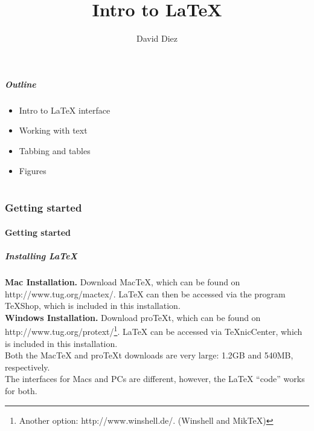 \documentclass[slidestop,compress,mathserif]{beamer}
\title{Intro to LaTeX}
\subtitle{}
\author{David Diez}
\institute{OpenIntro \\ \href{http://www.openintro.org}{openintro.org}}
\date{}
\begin{document}
\newenvironment{act}[1]{{\color{command}#1}}{}


\frame{ \titlepage }

\begin{frame}
  \frametitle{Outline}
  \begin{itemize}
  \item Intro to LaTeX interface
  \item Working with text
  \item Tabbing and tables
  \item Figures
  \end{itemize}
\end{frame}

\part{}

\section[Getting started]{Getting started}

\subsection[Getting started]{Getting started}

\begin{frame} \frametitle{Installing LaTeX}
{\bf Mac Installation. } Download MacTeX, which can be found on {\color{highlight}http://www.tug.org/mactex/}. LaTeX can then be accessed via the program TeXShop, which is included in this installation. \\
\vspace{0.5cm}
{\bf Windows Installation. } Download proTeXt, which can be found on {\color{highlight}http://www.tug.org/protext/}\footnote{Another option: {\color{highlight}http://www.winshell.de/}. (Winshell and MikTeX)}. LaTeX can be accessed via TeXnicCenter, which is included in this installation. \\
\vspace{0.5cm}
Both the MacTeX and proTeXt downloads are very large: 1.2GB and 540MB, respectively. \\
\vspace{0.5cm}
The interfaces for Macs and PCs are different, however, the LaTeX ``code'' works for both.
\end{frame}
\end{document}
